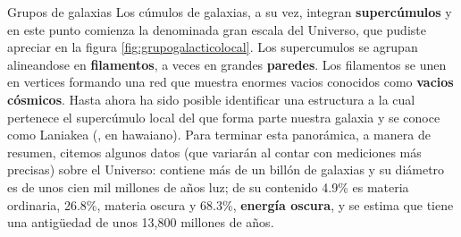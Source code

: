 \documentclass[12pt,addpoints]{guia}
\begin{document}
\begin{sectionbox}{Grupos de galaxias}
    Los cúmulos de galaxias, a su vez, integran \label{087b_b}\textbf{supercúmulos} y en este punto comienza la denominada gran escala del Universo, que pudiste apreciar en la figura \ref{fig:grupogalacticolocal}. Los supercumulos se agrupan alineandose en \label{087b_c}\textbf{filamentos}, a veces en grandes \textbf{paredes}. Los filamentos se unen en vertices formando una red que muestra enormes \label{087b_d}vacios conocidos como \textbf{vacios cósmicos}.
    Hasta ahora ha sido posible identificar una estructura a la cual
    pertenece el supercúmulo local del que forma parte nuestra galaxia y se conoce como Laniakea (, en hawaiano).
    Para terminar esta panorámica, a manera de resumen, citemos
    algunos datos (que variarán al contar con mediciones más precisas)
    sobre el Universo: contiene más de un billón de galaxias y su diámetro es de unos cien mil millones de años luz; de su contenido
    4.9\% es materia ordinaria, 26.8\%, materia oscura y 68.3\%, \textbf{energía
    oscura}, y se estima que tiene una antigüedad de unos 13,800 millones de años.
\end{sectionbox}
\begin{questions}
    \questionboxed[25]{}
    \questionboxed[25]{}
    \questionboxed[25]{}
    \questionboxed[25]{}
\end{questions}
\end{document}
